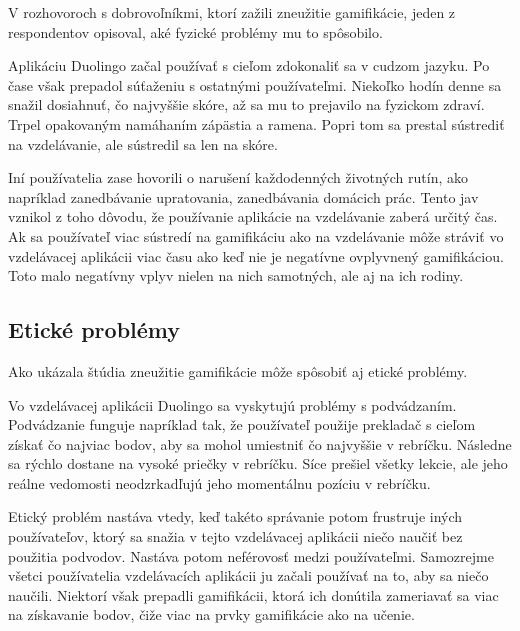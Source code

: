 \documentclass[10pt,twoside,slovak,a4paper]{article}
\begin{document}
V rozhovoroch\cite{HadiMogavi2022} s dobrovoľníkmi, ktorí zažili zneužitie gamifikácie, jeden z respondentov opisoval, aké fyzické problémy mu to spôsobilo. 

Aplikáciu Duolingo začal používať s cieľom zdokonaliť sa v cudzom jazyku. Po čase však prepadol súťaženiu s ostatnými používateľmi. Niekoľko hodín denne sa snažil dosiahnuť, čo najvyššie skóre, až sa mu to prejavilo na fyzickom zdraví. Trpel opakovaným namáhaním zápästia a ramena. Popri tom sa prestal sústrediť na vzdelávanie, ale sústredil sa len na skóre. 

Iní používatelia zase hovorili o narušení každodenných životných rutín, ako napríklad zanedbávanie upratovania, zanedbávania domácich prác. Tento jav vznikol z toho dôvodu, že používanie aplikácie na vzdelávanie zaberá určitý čas. Ak sa používateľ viac sústredí na gamifikáciu ako na vzdelávanie môže stráviť vo vzdelávacej aplikácii viac času ako keď nie je negatívne ovplyvnený gamifikáciou. Toto malo negatívny vplyv nielen na nich samotných, ale aj na ich rodiny\cite{HadiMogavi2022}.


\subsection{Etické problémy} \label{Vplyv:Etické problémy}

Ako ukázala štúdia\cite{HadiMogavi2022} zneužitie gamifikácie môže spôsobiť aj etické problémy.

Vo vzdelávacej aplikácii Duolingo sa vyskytujú problémy s podvádzaním. Podvádzanie funguje napríklad tak, že používateľ použije prekladač s cieľom získať čo najviac bodov, aby sa mohol umiestniť čo najvyššie v rebríčku.
Následne sa rýchlo dostane na vysoké priečky v rebríčku. Síce prešiel všetky lekcie, ale jeho reálne vedomosti neodzrkadľujú jeho momentálnu pozíciu v rebríčku.

Etický problém nastáva vtedy, keď takéto správanie potom frustruje iných používateľov, ktorý sa snažia v tejto vzdelávacej aplikácii niečo naučiť bez použitia podvodov. Nastáva potom neférovosť medzi používateľmi.
Samozrejme všetci používatelia vzdelávacích aplikácii ju začali používať na to, aby sa niečo naučili. Niektorí však prepadli gamifikácii, ktorá ich donútila zameriavať sa viac na získavanie bodov, čiže viac na prvky gamifikácie ako na učenie.
\end{document}
